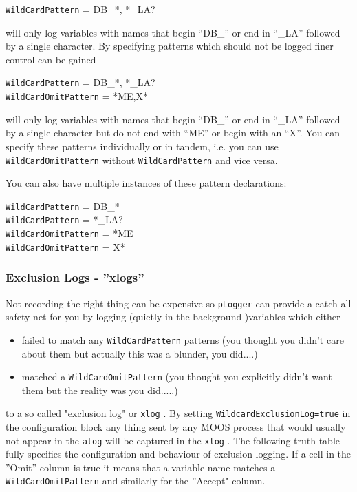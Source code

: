 \documentclass[a4paper,10pt]{article}
\newcommand{\Code}[1]{\texttt{#1} }
\newcommand{\code}[1]{\Code{#1} }
\begin{document}
\begin{center}
\code{WildCardPattern} =  DB\_*, *\_LA?
\end{center}

will only log variables with names that begin ``DB\_'' or end in ``\_LA'' followed by a single character. By specifying patterns which should not be logged finer control can be gained

\begin{center}
\code{WildCardPattern} =  DB\_*, *\_LA? \\
\code{WildCardOmitPattern} =  *ME,X*
\end{center}

will only log variables with names that  begin ``DB\_'' or end in ``\_LA'' followed by a single character but do not end with ``ME'' or begin with an ``X''. You can specify these patterns individually or  in tandem, i.e. you can use \code{WildCardOmitPattern}  without \code{WildCardPattern}  and vice versa.

You can also have multiple instances of these pattern declarations:

\begin{center}
\code{WildCardPattern} =  DB\_*\\
\code{WildCardPattern} =  *\_LA? \\
\code{WildCardOmitPattern} =  *ME\\
\code{WildCardOmitPattern} = X*
\end{center}



\subsubsection{Exclusion Logs - ''xlogs''}

Not recording the right thing can be expensive so \code{pLogger} can provide a catch all safety net for you by logging (quietly in the background )variables which either

\begin{itemize}
\item failed to match any  \code{WildCardPattern} patterns (you thought you didn't care about them but actually this was a blunder, you did....)
\item matched a \code{WildCardOmitPattern} (you thought you explicitly didn't want them but the reality was you did.....)
\end{itemize}

to a so called "exclusion log" or \code{xlog}. By setting \code{WildcardExclusionLog=true} in the configuration block any thing sent by any MOOS process that would usually not appear in the \code{alog} will be captured in the \code{xlog}. The following truth table fully specifies the configuration and behaviour of exclusion logging. If a cell in the ''Omit'' column is true it means that a variable name matches a \code{WildCardOmitPattern} and similarly for the ''Accept" column.
\end{document}
